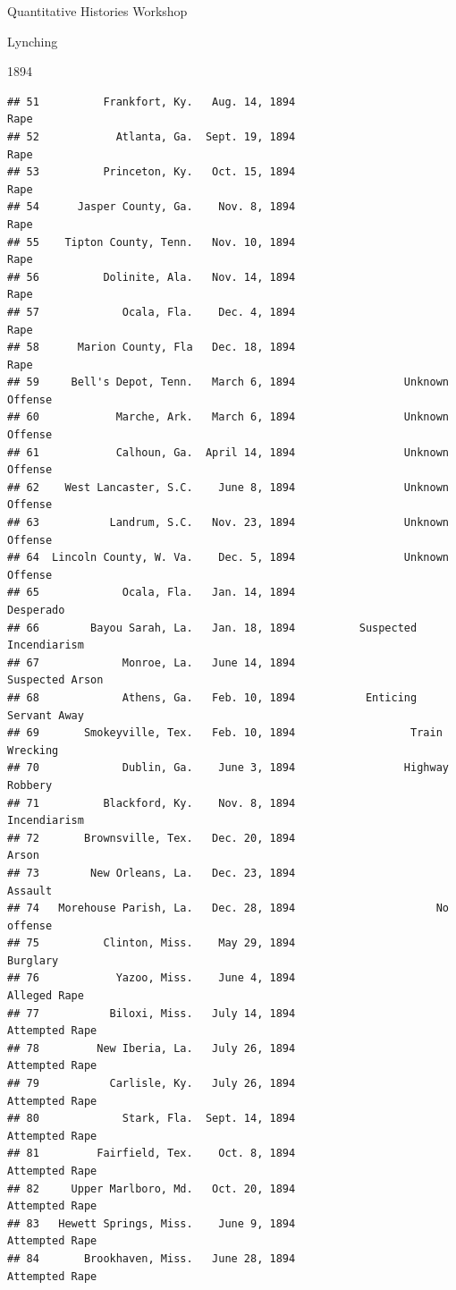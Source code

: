 \documentclass[
  ignorenonframetext,
]{beamer}
\begin{document}
\begin{frame}[fragile]{Quantitative Histories Workshop}
\begin{block}{Lynching}
\begin{block}{1894}
\begin{verbatim}
## 51          Frankfort, Ky.   Aug. 14, 1894                            Rape
## 52            Atlanta, Ga.  Sept. 19, 1894                            Rape
## 53          Princeton, Ky.   Oct. 15, 1894                            Rape
## 54      Jasper County, Ga.    Nov. 8, 1894                            Rape
## 55    Tipton County, Tenn.   Nov. 10, 1894                            Rape
## 56          Dolinite, Ala.   Nov. 14, 1894                            Rape
## 57             Ocala, Fla.    Dec. 4, 1894                            Rape
## 58      Marion County, Fla   Dec. 18, 1894                            Rape
## 59     Bell's Depot, Tenn.   March 6, 1894                 Unknown Offense
## 60            Marche, Ark.   March 6, 1894                 Unknown Offense
## 61            Calhoun, Ga.  April 14, 1894                 Unknown Offense
## 62    West Lancaster, S.C.    June 8, 1894                 Unknown Offense
## 63           Landrum, S.C.   Nov. 23, 1894                 Unknown Offense
## 64  Lincoln County, W. Va.    Dec. 5, 1894                 Unknown Offense
## 65             Ocala, Fla.   Jan. 14, 1894                       Desperado
## 66        Bayou Sarah, La.   Jan. 18, 1894          Suspected Incendiarism
## 67             Monroe, La.   June 14, 1894                 Suspected Arson
## 68             Athens, Ga.   Feb. 10, 1894           Enticing Servant Away
## 69       Smokeyville, Tex.   Feb. 10, 1894                  Train Wrecking
## 70             Dublin, Ga.    June 3, 1894                 Highway Robbery
## 71          Blackford, Ky.    Nov. 8, 1894                    Incendiarism
## 72       Brownsville, Tex.   Dec. 20, 1894                           Arson
## 73        New Orleans, La.   Dec. 23, 1894                         Assault
## 74   Morehouse Parish, La.   Dec. 28, 1894                      No offense
## 75          Clinton, Miss.    May 29, 1894                        Burglary
## 76            Yazoo, Miss.    June 4, 1894                    Alleged Rape
## 77           Biloxi, Miss.   July 14, 1894                  Attempted Rape
## 78         New Iberia, La.   July 26, 1894                  Attempted Rape
## 79           Carlisle, Ky.   July 26, 1894                  Attempted Rape
## 80             Stark, Fla.  Sept. 14, 1894                  Attempted Rape
## 81         Fairfield, Tex.    Oct. 8, 1894                  Attempted Rape
## 82     Upper Marlboro, Md.   Oct. 20, 1894                  Attempted Rape
## 83   Hewett Springs, Miss.    June 9, 1894                  Attempted Rape
## 84       Brookhaven, Miss.   June 28, 1894                  Attempted Rape

\end{verbatim}
\end{block}
\end{block}
\end{frame}
\end{document}

